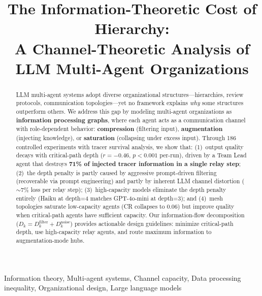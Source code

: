 \documentclass[conference]{IEEEtran}
\begin{document}
\title{The Information-Theoretic Cost of Hierarchy:\\
A Channel-Theoretic Analysis of LLM Multi-Agent Organizations}

\author{
\IEEEauthorblockA{
}
}

\maketitle

\begin{abstract}


LLM multi-agent systems adopt diverse organizational structures---hierarchies, review protocols, communication topologies---yet no framework explains \emph{why} some structures outperform others.
We address this gap by modeling multi-agent organizations as \textbf{information processing graphs}, where each agent acts as a communication channel with role-dependent behavior: \textbf{compression} (filtering input), \textbf{augmentation} (injecting knowledge), or \textbf{saturation} (collapsing under excess input).
Through 186 controlled experiments with tracer survival analysis, we show that:
(1)~output quality decays with critical-path depth ($r = -0.46$, $p < 0.001$ per-run), driven by a Team Lead agent that destroys \textbf{71\% of injected tracer information in a single relay step};
(2)~the depth penalty is partly caused by aggressive prompt-driven filtering (recoverable via prompt engineering) and partly by inherent LLM channel distortion ($\sim$7\% loss per relay step);
(3)~high-capacity models eliminate the depth penalty entirely (Haiku at depth=4 matches GPT-4o-mini at depth=3);
and (4)~mesh topologies saturate low-capacity agents (CR collapses to 0.06) but improve quality when critical-path agents have sufficient capacity.
Our information-flow decomposition ($D_k = D_k^{\text{filter}} + D_k^{\text{noise}}$) provides actionable design guidelines: minimize critical-path depth, use high-capacity relay agents, and route maximum information to augmentation-mode hubs.

\end{abstract}

\begin{IEEEkeywords}
Information theory, Multi-agent systems, Channel capacity, Data processing inequality, Organizational design, Large language models
\end{IEEEkeywords}
\end{document}
